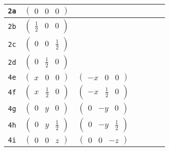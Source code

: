 \documentclass[fleqn,9pt,landscape]{jsarticle}
\begin{document}
\begin{center}
\begin{longtable}{ccccccc}
{\tt 2a} & $ \begin{pmatrix} 0 & 0 & 0 \end{pmatrix} $ & $  $ & $  $ & $  $ & $  $ & $  $ \\ \hline
{\tt 2b} & $ \begin{pmatrix} \frac{1}{2} & 0 & 0 \end{pmatrix} $ & $  $ & $  $ & $  $ & $  $ & $  $ \\ \hline
{\tt 2c} & $ \begin{pmatrix} 0 & 0 & \frac{1}{2} \end{pmatrix} $ & $  $ & $  $ & $  $ & $  $ & $  $ \\ \hline
{\tt 2d} & $ \begin{pmatrix} 0 & \frac{1}{2} & 0 \end{pmatrix} $ & $  $ & $  $ & $  $ & $  $ & $  $ \\ \hline
{\tt 4e} & $ \begin{pmatrix} x & 0 & 0 \end{pmatrix} $ & $ \begin{pmatrix} - x & 0 & 0 \end{pmatrix} $ & $  $ & $  $ & $  $ & $  $ \\ \hline
{\tt 4f} & $ \begin{pmatrix} x & \frac{1}{2} & 0 \end{pmatrix} $ & $ \begin{pmatrix} - x & \frac{1}{2} & 0 \end{pmatrix} $ & $  $ & $  $ & $  $ & $  $ \\ \hline
{\tt 4g} & $ \begin{pmatrix} 0 & y & 0 \end{pmatrix} $ & $ \begin{pmatrix} 0 & - y & 0 \end{pmatrix} $ & $  $ & $  $ & $  $ & $  $ \\ \hline
{\tt 4h} & $ \begin{pmatrix} 0 & y & \frac{1}{2} \end{pmatrix} $ & $ \begin{pmatrix} 0 & - y & \frac{1}{2} \end{pmatrix} $ & $  $ & $  $ & $  $ & $  $ \\ \hline
{\tt 4i} & $ \begin{pmatrix} 0 & 0 & z \end{pmatrix} $ & $ \begin{pmatrix} 0 & 0 & - z \end{pmatrix} $ & $  $ & $  $ & $  $ & $  $ \\ \hline

\end{longtable}
\end{center}
\end{document}
